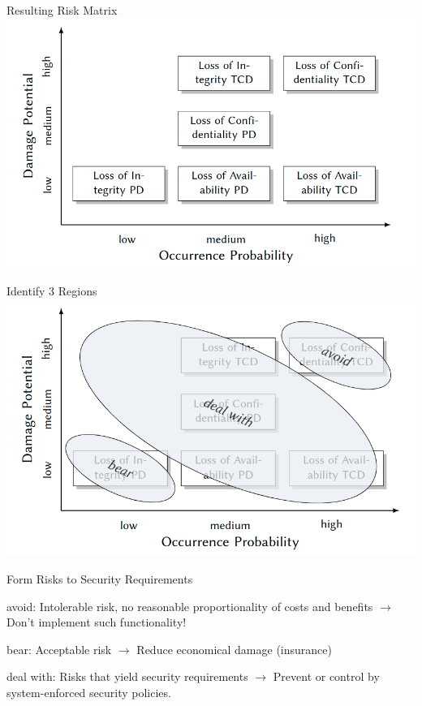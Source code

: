 \documentclass[a4paper]{article}
\begin{document}
\begin{multicols}{3}
    \begin{multicols*}{2}
        \begin{center}
            Resulting Risk Matrix
            \includegraphics[width=.9\linewidth]{Assets/Systemsicherheit-risk-matrix-1.png}
        \end{center}
        \begin{center}
            Identify 3 Regions
            \includegraphics[width=.9\linewidth]{Assets/Systemsicherheit-Risk-Matrix-2.png}
        \end{center}
    \end{multicols*}

    Form Risks to Security Requirements
    \begin{itemize*}
        \item avoid: Intolerable risk, no reasonable proportionality of costs and benefits $\rightarrow$ Don’t implement such functionality!
        \item bear: Acceptable risk $\rightarrow$ Reduce economical damage (insurance)
        \item deal with: Risks that yield security requirements $\rightarrow$ Prevent or control by system-enforced security policies.
    \end{itemize*}


\end{multicols}
\end{document}
